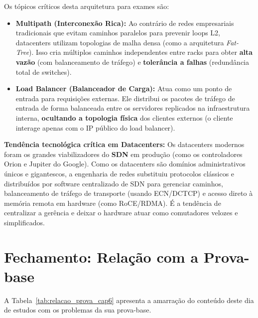 \documentclass[11pt,a4paper]{article}
\begin{document}
Os tópicos críticos desta arquitetura para exames são:
\begin{itemize}
    \item \textbf{Multipath (Interconexão Rica):} Ao contrário de redes empresariais tradicionais que evitam caminhos paralelos para prevenir loops L2, datacenters utilizam topologias de malha densa (como a arquitetura \emph{Fat-Tree}). Isso cria múltiplos caminhos independentes entre racks para obter \textbf{alta vazão} (com balanceamento de tráfego) e \textbf{tolerância a falhas} (redundância total de switches).
    \item \textbf{Load Balancer (Balanceador de Carga):} Atua como um ponto de entrada para requisições externas. Ele distribui os pacotes de tráfego de entrada de forma balanceada entre os servidores replicados na infraestrutura interna, \textbf{ocultando a topologia física} dos clientes externos (o cliente interage apenas com o IP público do load balancer).
\end{itemize}

\begin{reflexao}
\textbf{Tendência tecnológica crítica em Datacenters:}
Os datacenters modernos foram os grandes viabilizadores do \textbf{SDN} em produção (como os controladores Orion e Jupiter do Google). Como os datacenters são domínios administrativos únicos e gigantescos, a engenharia de redes substituiu protocolos clássicos e distribuídos por software centralizado de SDN para gerenciar caminhos, balanceamento de tráfego de transporte (usando ECN/DCTCP) e acesso direto à memória remota em hardware (como RoCE/RDMA). É a tendência de centralizar a gerência e deixar o hardware atuar como comutadores velozes e simplificados.
\end{reflexao}

\hrulefill

\section*{Fechamento: Relação com a Prova-base}

A Tabela~\ref{tab:relacao_prova_cap6} apresenta a amarração do conteúdo deste dia de estudos com os problemas da sua prova-base.
\end{document}
